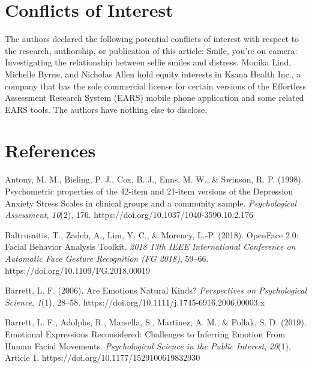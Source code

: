 \documentclass[authordate, empirical]{jote-new-article}
\begin{document}
\section{Conflicts of Interest}







The authors declared the following potential conflicts of interest with respect to the research, authorship, or publication of this article: Smile, you're on camera: Investigating the relationship between selfie smiles and distress. Monika Lind, Michelle Byrne, and Nicholas Allen hold equity interests in Ksana Health Inc., a company that has the sole commercial license for certain versions of the Effortless Assessment Research System (EARS) mobile phone application and some related EARS tools. The authors have nothing else to disclose.







\section{References}



\hspace*{\parindent}Antony, M. M., Bieling, P. J., Cox, B. J., Enns, M. W., \& Swinson, R. P. (1998). Psychometric properties of the 42-item and 21-item versions of the Depression Anxiety Stress Scales in clinical groups and a community sample. \emph{Psychological Assessment}, \emph{10}(2), 176. https://doi.org/10.1037/1040-3590.10.2.176



Baltrusaitis, T., Zadeh, A., Lim, Y. C., \& Morency, L.-P. (2018). OpenFace 2.0: Facial Behavior Analysis Toolkit. \emph{2018 13th IEEE International Conference on Automatic Face Gesture Recognition (FG 2018)}, 59--66. https://doi.org/10.1109/FG.2018.00019



Barrett, L. F. (2006). Are Emotions Natural Kinds? \emph{Perspectives on Psychological Science}, \emph{1}(1), 28--58. https://doi.org/10.1111/j.1745-6916.2006.00003.x



Barrett, L. F., Adolphs, R., Marsella, S., Martinez, A. M., \& Pollak, S. D. (2019). Emotional Expressions Reconsidered: Challenges to Inferring Emotion From Human Facial Movements. \emph{Psychological Science in the Public Interest}, \emph{20}(1), Article 1. https://doi.org/10.1177/1529100619832930
\end{document}
